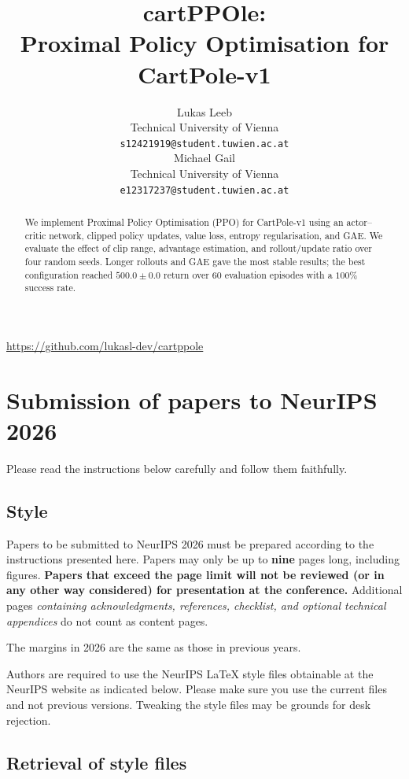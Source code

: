 \documentclass{article}
\title{cartPPOle: \\ Proximal Policy Optimisation for CartPole-v1}
\author{%
  Lukas Leeb \\
  Technical University of Vienna \\
  \texttt{s12421919@student.tuwien.ac.at} \\
  \And
  Michael Gail \\
  Technical University of Vienna \\
  \texttt{e12317237@student.tuwien.ac.at} \\
}
\begin{document}
\maketitle


\begin{abstract}
  We implement Proximal Policy Optimisation (PPO) for CartPole-v1 using an actor--critic network, clipped policy updates, value loss, entropy regularisation, and GAE. We evaluate the effect of clip range, advantage estimation, and rollout/update ratio over four random seeds. Longer rollouts and GAE gave the most stable results; the best configuration reached $500.0 \pm 0.0$ return over 60 evaluation episodes with a $100\%$ success rate.
\end{abstract}

\begin{center}
  \url{https://github.com/lukasl-dev/cartppole}
\end{center}

\iffalse

\section{Submission of papers to NeurIPS 2026}


Please read the instructions below carefully and follow them faithfully.


\subsection{Style}


Papers to be submitted to NeurIPS 2026 must be prepared according to the
instructions presented here. Papers may only be up to {\bf nine} pages long, including figures. \textbf{Papers that exceed the page limit will not be reviewed (or in any other way considered) for presentation at the conference.}
Additional pages \emph{containing acknowledgments, references, checklist, and optional technical appendices} do not count as content pages. 


The margins in 2026 are the same as those in previous years.


Authors are required to use the NeurIPS \LaTeX{} style files obtainable at the NeurIPS website as indicated below. Please make sure you use the current files and not previous versions. Tweaking the style files may be grounds for desk rejection.


\subsection{Retrieval of style files}
\end{document}
